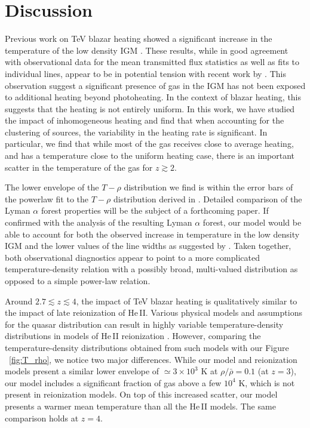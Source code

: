\documentclass[numberedappendix]{emulateapj}
\begin{document}
\section{Discussion}
Previous work on TeV blazar heating showed a significant increase in the temperature of the low density IGM \citep{2012ApJ...752...23C,2012MNRAS.423..149P}. These results, while in good agreement with observational data for the mean transmitted flux statistics as well as fits to individual lines, appear to be in potential tension with recent work by \citet{2012ApJ...757L..30R}. This observation suggest a significant presence of gas in the IGM has not been exposed to additional heating beyond photoheating. In the context of blazar heating, this suggests that the heating is not entirely uniform. In this work, we have studied the impact of inhomogeneous heating and find that when accounting for the clustering of sources, the variability in the heating rate is significant. In particular, we find that while most of the gas receives close to average heating, and has a temperature close to the uniform heating case, there is an important scatter in the temperature of the gas  for $z\gtrsim 2$. 

The lower envelope of the $T-\rho$ distribution we find is within the error bars of the powerlaw fit to the $T-\rho$ distribution derived in \citet{2014MNRAS.438.2499B}. Detailed comparison of the Lyman $\alpha$ forest properties will be the subject of a forthcoming paper. If confirmed with the analysis of the resulting Lyman $\alpha$ forest, our model would be able to account for both the observed increase in temperature in the low density IGM \citep{2014MNRAS.441.1916B,2011MNRAS.410.1096B,2009MNRAS.399L..39V} and the lower values of the line widths as suggested by \citet{2012ApJ...757L..30R}. Taken together, both observational diagnostics appear to point to a more complicated temperature-density relation with a possibly broad, multi-valued distribution as opposed to a simple power-law relation.

Around $2.7\lesssim z \lesssim 4$, the impact of TeV blazar heating is qualitatively similar to the impact of late reionization of He\,\textsc{II}.  Various physical models and assumptions for the quasar distribution can result in highly variable temperature-density distributions in models of He\,\textsc{II} reionization \citep{2004MNRAS.348L..43B,2009ApJ...694..842M}. However, comparing the temperature-density distributions  obtained from such models with our Figure ~\ref{fig:T_rho},  we notice two major differences. While our model and reionization models present a similar lower envelope of $\simeq 3\times 10^3$ K at $\rho/\bar{\rho}=0.1$ (at $z=3$), our model includes a significant fraction of gas above a few $10^4$ K, which is not present in reionization models. On top of this increased scatter, our model presents a warmer mean temperature than all the He\,\textsc{II} models. The same comparison holds at $z=4$. 
\end{document}
